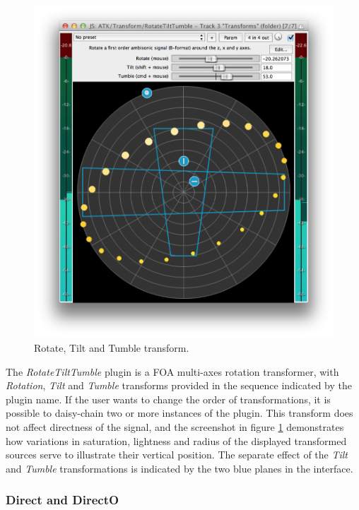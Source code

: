 \documentclass{article}
\begin{document}
\begin{figure}[h]
\captionsetup{aboveskip=-6pt}
\centering
\includegraphics[width=0.9\columnwidth]{figures/rotateTiltTumble.png}
\setlength{\abovecaptionskip}{0pt plus 3pt minus 2pt} %
\caption{Rotate, Tilt and Tumble transform.\label{fig:rotateTransform}}
\end{figure}

The \emph{RotateTiltTumble} plugin is a FOA multi-axes rotation transformer, with \emph{Rotation}, \emph{Tilt} and \emph{Tumble} transforms provided in the sequence indicated by the plugin name.
If the user wants to change the order of transformations, it is possible to daisy-chain two or more instances of the plugin.
This transform does not affect directness of the signal, and the screenshot in figure \ref{fig:rotateTransform} demonstrates how variations in saturation, lightness and radius of the displayed transformed sources serve to illustrate their vertical position. The separate effect of the \emph{Tilt} and \emph{Tumble} transformations is indicated by the two blue planes in the interface.



\subsubsection{Direct and DirectO}\label{sec:direct}
\end{document}
